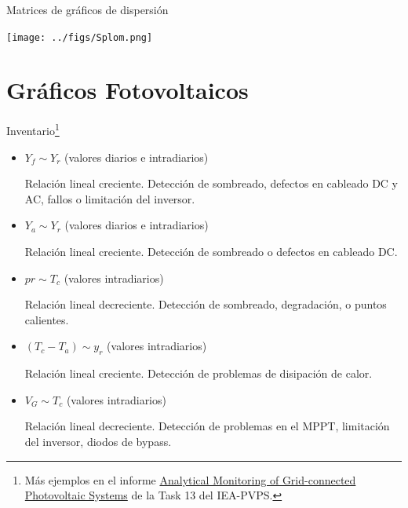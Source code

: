 \documentclass[aspectratio=169, usenames,svgnames,dvipsnames]{beamer}
\begin{document}
\begin{frame}[label={sec:org2f87a76}]{Matrices de gráficos de dispersión}
\begin{center}
\texttt{[image: ../figs/Splom.png]}
\end{center}
\end{frame}

\section{Gráficos Fotovoltaicos}
\label{sec:org95a13f6}

\begin{frame}[label={sec:org89d3687}]{Inventario\footnote{Más ejemplos en el informe \guillemotleft{}\href{https://iea-pvps.org/key-topics/analytical-monitoring-of-pv-systems-final/}{Analytical Monitoring of Grid-connected Photovoltaic Systems}\guillemotright{} de la Task 13 del IEA-PVPS.}}
\begin{itemize}
\item \(Y_f \sim Y_r\) (valores diarios e intradiarios)

Relación lineal creciente. Detección de sombreado, defectos en cableado DC y AC, fallos o limitación del inversor.

\item \(Y_a \sim Y_r\) (valores diarios e intradiarios)

Relación lineal creciente. Detección de sombreado o defectos en cableado DC.

\item \(pr \sim T_c\)  (valores intradiarios)

Relación lineal decreciente. Detección de sombreado, degradación, o puntos calientes.

\item \((T_c - T_a) \sim y_r\) (valores intradiarios)

Relación lineal creciente. Detección de problemas de disipación de calor.

\item \(V_G \sim T_c\) (valores intradiarios)

Relación lineal decreciente. Detección de problemas en el MPPT, limitación del inversor, diodos de bypass.
\end{itemize}
\end{frame}
\end{document}
